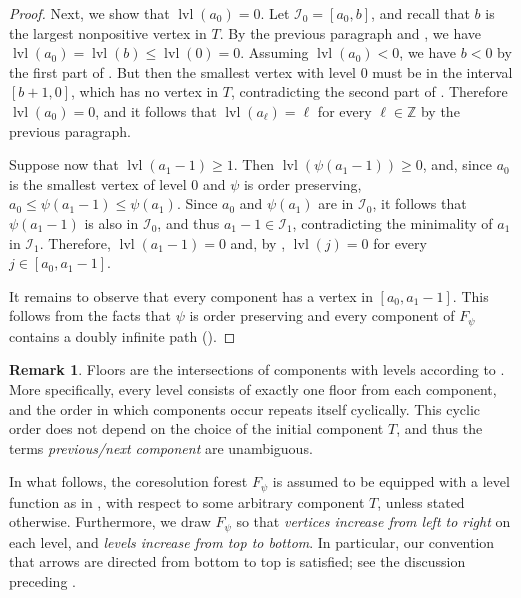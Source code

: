 \documentclass[a4paper]{amsart}
\theoremstyle{definition}
\newtheorem{remark}[theorem]{Remark}
\theoremstyle{remark}
\numberwithin{equation}{theorem}
\newcommand{\Dfn}[1]{\emph{\color{blue}#1}} %
\newcommand{\Z}{\mathbb{Z}}
\newcommand{\level}{\operatorname{lvl}}
\newcommand{\psiforest}{F_\psi}
\begin{document}
\begin{proof}
    Next, we show that $ \level ( a_0 ) = 0 $. Let $ \mathcal I_0 = [ a_0 , b ] $, and recall that $ b $ is the largest nonpositive vertex in $ T $. By the previous paragraph and , we have $ \level(a_0) = \level(b) \leq \level(0)=0$.
    Assuming $\level(a_0)<0$, we
  have $b<0$ by the first part of .  But then the smallest
  vertex with level $0$ must be in the interval $[b+1, 0]$, which has
  no vertex in $T$, contradicting the second part of .
  Therefore $ \level ( a_0 ) = 0 $, and it follows that $ \level( a_\ell ) = \ell $ for every $ \ell \in \Z $ by the previous paragraph.



  Suppose now that $\level(a_1-1)\geq1$.  Then
  $\level(\psi(a_1-1))\geq0$, and, since $a_0$ is the smallest vertex
  of level $0$ and $ \psi $ is order preserving, $a_0 \leq \psi(a_1-1) \leq \psi( a_1 )$. Since $ a_0 $ and $ \psi( a_1 ) $ are in $ \mathcal I_0 $, it follows that $ \psi( a_1-1 ) $ is also in $ \mathcal I_0 $, and thus $ a_1 - 1 \in \mathcal I_1 $, contradicting the minimality of $ a_1 $ in $ \mathcal I_1 $. Therefore, $ \level( a_1 - 1 ) = 0 $ and, by , $ \level( j ) = 0 $ for every $ j \in [ a_0 , a_1 - 1 ] $.

    It remains to observe that every component has a vertex in $ [a_0,a_1-1] $. This follows from the facts that $ \psi $ is order preserving and every component of $ \psiforest $ contains a doubly infinite path ().
\end{proof}

\begin{remark}\label{rem:component.order}
    Floors are the intersections of components with levels according to . More specifically, every level consists of exactly one floor from each component, and the order in which components occur repeats itself cyclically. This cyclic order does not depend on the choice of the initial component $ T $, and thus the terms \Dfn{previous/next component} are unambiguous.
\end{remark}

In what follows, the coresolution forest $\psiforest$ is assumed to be equipped with a level function as in , with respect to some arbitrary component $T$, unless stated otherwise. Furthermore, we draw $\psiforest$ so that \emph{vertices increase from left to right} on each level, and \emph{levels increase from top to bottom}. In particular, our convention that arrows are directed from bottom to top is satisfied; see the discussion preceding .
\end{document}
